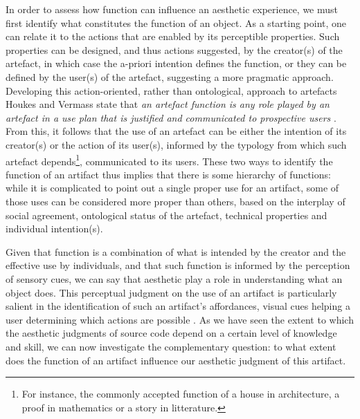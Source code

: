 In order to assess how function can influence an aesthetic experience, we must first identify what constitutes the function of an object. As a starting point, one can relate it to the actions that are enabled by its perceptible properties. Such properties can be designed, and thus actions suggested, by the creator(s) of the artefact, in which case the a-priori intention defines the function, or they can be defined by the user(s) of the artefact, suggesting a more pragmatic approach. Developing this action-oriented, rather than ontological, approach to artefacts Houkes and Vermass state that \emph{an artefact function is any role played by an artefact in a use plan that is justified and communicated to prospective users} \citep{houkes_actions_2004}. From this, it follows that the use of an artefact can be either the intention of its creator(s) or the action of its user(s), informed by the typology from which such artefact depends\footnote{For instance, the commonly accepted function of a house in architecture, a proof in mathematics or a story in litterature.}, communicated to its users. These two ways to identify the function of an artifact thus implies that there is some hierarchy of functions: while it is complicated to point out a single proper use for an artifact, some of those uses can be considered more proper than others, based on the interplay of social agreement, ontological status of the artefact, technical properties and individual intention(s).

Given that function is a combination of what is intended by the creator and the effective use by individuals, and that such function is informed by the perception of sensory cues, we can say that aesthetic play a role in understanding what an object does. This perceptual judgment on the use of an artifact is particularly salient in the identification of such an artifact's affordances, visual cues helping a user determining which actions are possible \citep{norman_design_2013}. As we have seen the extent to which the aesthetic judgments of source code depend on a certain level of knowledge and skill, we can now investigate the complementary question: to what extent does the function of an artifact influence our aesthetic judgment of this artifact.

